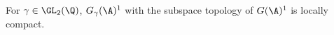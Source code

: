For $\gamma\in\GL_2(\Q)$, $G_\gamma(\A)^1$ with the subspace topology of $G(\A)^1$ is locally compact.
